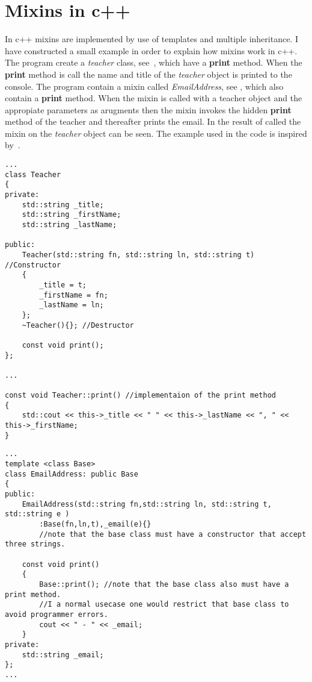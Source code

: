 \section{Mixins in c++}

In c++ mixins are implemented by use of templates and multiple inheritance. 
I have constructed a small example in order to explain how mixins work in c++.
The program create a \textit{teacher} class, see~, which have a \textbf{print} method. 
When the \textbf{print} method is call the name and title of the \textit{teacher} object is printed to the console.
The program contain a mixin called \textit{EmailAddress}, see , which also contain a \textbf{print} method.
When the mixin is called with a teacher object and the appropiate parameters as arugments then the mixin invokes the hidden \textbf{print} method of the teacher and thereafter prints the email. 
In  the result of called the mixin on the \textit{teacher} object can be seen. The example used in the code is inspired by~\cite{drdobbs}.


\begin{lstlisting}[style=cpp, caption=\myCaption{the Teacher.h and Teacher.cpp code. The class Teacher contain one method called print and three fields called \_title, \_firstname, and \_lastname}, label=Teacher1]
...
class Teacher 
{
private:
    std::string _title;
    std::string _firstName;
    std::string _lastName;

public:
    Teacher(std::string fn, std::string ln, std::string t) //Constructor
    {
        _title = t;
        _firstName = fn;
        _lastName = ln;
    };
    ~Teacher(){}; //Destructor

    const void print();
};

...

const void Teacher::print() //implementaion of the print method
{
    std::cout << this->_title << " " << this->_lastName << ", " << this->_firstName; 
}
\end{lstlisting}

\begin{lstlisting}[style=cpp, caption=\myCaption{The mixin EmailAddress. The mixin requires a class as input and four parameters. The print function of the recieved class is invoked and it prinst the email address.  }, label=EmailAddress1]
...
template <class Base>
class EmailAddress: public Base
{
public:
    EmailAddress(std::string fn,std::string ln, std::string t, std::string e )
        :Base(fn,ln,t),_email(e){}
        //note that the base class must have a constructor that accept three strings.

    const void print() 
    {
        Base::print(); //note that the base class also must have a print method.
        //I a normal usecase one would restrict that base class to avoid programmer errors. 
        cout << " - " << _email;
    }
private:
    std::string _email;
};
...

\end{lstlisting}



